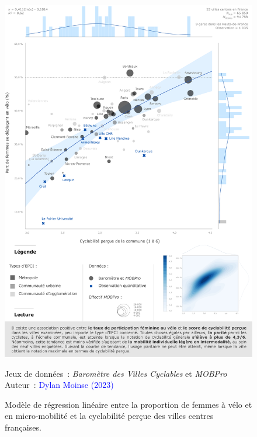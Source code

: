 \begin{refsegment}
    \begin{figure}[h!]\vspace*{4pt}
        \caption{Modèle de régression linéaire entre la proportion de femmes à vélo et en micro-mobilité et la cyclabilité perçue des villes centres françaises.}
        \label{fig-chap4:regression-genre-cyclabilite}
        \centerline{\includegraphics[width=1\columnwidth]{src/Figures/Chap-4/FR_Regression_genre_cyclabilite_OLS.pdf}}
        \vspace{5pt}
        \begin{flushright}\scriptsize{
        Jeux de données~: \textsl{Baromètre des Villes Cyclables} \textcolor{blue}{\autocite{fub_barometre_2021}} et \textsl{MOBPro} \textcolor{blue}{\autocite{insee_documentation_2023}}
        \\
        Auteur~: \textcolor{blue}{Dylan Moinse (2023)}
        }\end{flushright}
    \end{figure}


\end{refsegment}
